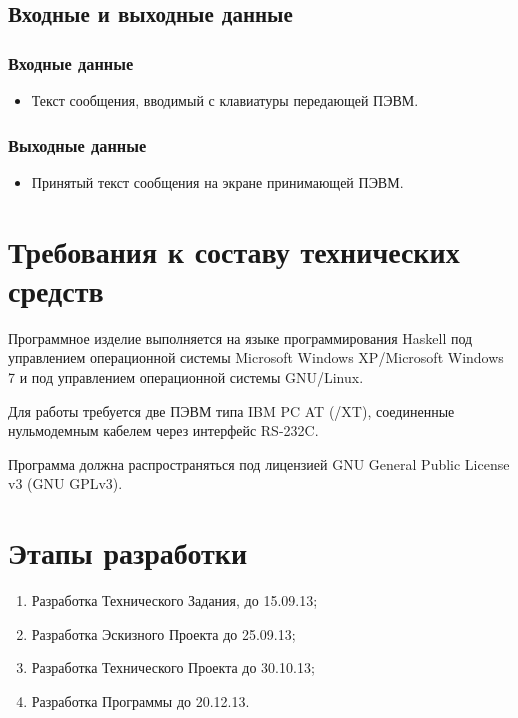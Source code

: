 \documentclass[14pt]{extarticle}
\begin{document}
\subsection{Входные и выходные данные}
\subsubsection{Входные данные}
\begin{itemize}
\item Текст сообщения, вводимый с клавиатуры передающей ПЭВМ.
\end{itemize}

\subsubsection{Выходные данные}
\begin{itemize}
\item Принятый текст сообщения на экране принимающей ПЭВМ.
\end{itemize}
\clearpage

\section{Требования к составу технических средств}
Программное изделие выполняется на языке программирования Haskell под управлением операционной системы Microsoft Windows XP/Microsoft Windows 7 и под управлением операционной системы GNU/Linux.

Для работы требуется две ПЭВМ типа IBM PC AT (/XT), соединенные нульмодемным кабелем через интерфейс RS-232C.

Программа должна распространяться под лицензией GNU General Public License v3 (GNU GPLv3).

\section{Этапы разработки}
\begin{enumerate}
\item Разработка Технического Задания, до 15.09.13;
\item Разработка Эскизного Проекта до 25.09.13;
\item Разработка Технического Проекта до 30.10.13;
\item Разработка Программы до 20.12.13.
\end{enumerate}
\end{document}

